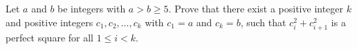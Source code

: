 Let $a$ and $b$ be integers with $a > b\geq 5$.
Prove that there exist a positive integer $k$ and positive integers $c_1, c_2, \ldots, c_k$ with
$c_1 = a$ and $c_k = b$, such that $c_i^2 + c_{i+1}^2$ is a perfect square for all $1 \leq i < k$.
